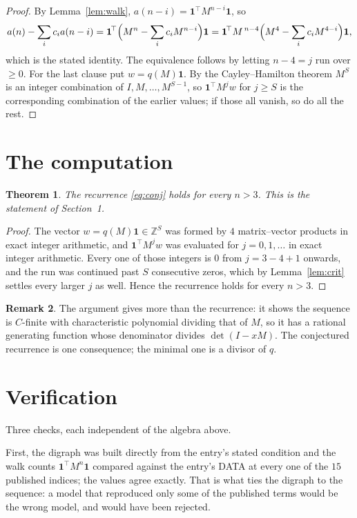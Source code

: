 \documentclass[11pt,a4paper]{article}
\theoremstyle{plain}
\newtheorem{theorem}{Theorem}
\theoremstyle{definition}
\newtheorem{remark}[theorem]{Remark}
\begin{document}
\begin{proof}
By Lemma~\ref{lem:walk}, $a(n-i)=\mathbf{1}^{\!\top}M^{n-i}\mathbf{1}$, so
\[
a(n)-\sum_i c_i a(n-i)
=\mathbf{1}^{\!\top}\Bigl(M^{n}-\sum_i c_i M^{n-i}\Bigr)\mathbf{1}
=\mathbf{1}^{\!\top}M^{\,n-4}\Bigl(M^{4}-\sum_i c_i M^{4-i}\Bigr)\mathbf{1},
\]
which is the stated identity. The equivalence follows by letting $n-4=j$ run over
$\ge0$. For the last clause put $w=q(M)\mathbf{1}$. By the Cayley--Hamilton theorem
$M^{S}$ is an integer combination of $I,M,\dots,M^{S-1}$, so
$\mathbf{1}^{\!\top}M^{j}w$ for $j\ge S$ is the corresponding combination of the
earlier values; if those all vanish, so do all the rest.
\end{proof}

\section{The computation}

\begin{theorem}
The recurrence \eqref{eq:conj} holds for every $n>3$. This is the statement of
Section~1.
\end{theorem}

\begin{proof}
The vector $w=q(M)\mathbf{1}\in\mathbb{Z}^{S}$ was formed by $4$ matrix--vector
products in exact integer arithmetic, and $\mathbf{1}^{\!\top}M^{j}w$ was evaluated for
$j=0,1,\dots$ in exact integer arithmetic. Every one of those integers is $0$ from
$j=3-4+1$ onwards, and the run was continued past $S$ consecutive zeros, which by
Lemma~\ref{lem:crit} settles every larger $j$ as well. Hence the recurrence holds for
every $n>3$.
\end{proof}

\begin{remark}
The argument gives more than the recurrence: it shows the sequence is $C$-finite with
characteristic polynomial dividing that of $M$, so it has a rational generating function
whose denominator divides $\det(I-xM)$. The conjectured recurrence is one consequence; the
minimal one is a divisor of $q$.
\end{remark}

\section{Verification}

Three checks, each independent of the algebra above.

First, the digraph was built directly from the entry's stated condition and the walk counts
$\mathbf{1}^{\!\top}M^{n}\mathbf{1}$ compared against the entry's DATA at every one of
the $15$ published indices; the values agree exactly. That is what ties the digraph to
the sequence: a model that reproduced only some of the published terms would be the wrong
model, and would have been rejected.
\end{document}
